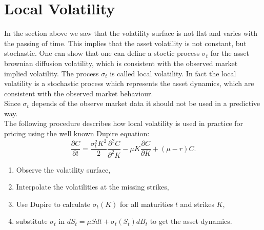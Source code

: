 \documentclass[12pt]{article}
\newcommand{\p}{\partial}
\begin{document}
\section{Local Volatility}
In the section above we saw that the volatility surface is not flat and varies with the passing of time. This implies that the asset volatility is not constant, but stochastic. One can show that one can define a stoctic process $\sigma_t$ for the asset brownian diffusion volatility, which is consistent with the observed market implied volatility. The process $\sigma_t$ is called local volatility. In fact the local volatility is a stochastic process which represents the asset dynamics, which are consistent with the observed market behaviour.\\
Since $\sigma_t$ depends of the observe market data it should not be used in a predictive way.\\
The following procedure describes how local volatility is used in practice for pricing using the well known Dupire equation:
$$\frac{\p C}{\p t}=\frac{\sigma_t^2 K^2}{2}\frac{\p^2 C}{\p^2 K}-\mu K \frac{\p C}{\p K}+(\mu-r)C.$$
\begin{enumerate}
\item Observe the volatility surface,
\item Interpolate the volatilities at the missing strikes,
\item Use Dupire to calculate $\sigma_t(K)$ for all maturities $t$ and strikes $K$,
\item substitute $\sigma_t$ in $dS_t=\mu Sdt + \sigma_t(S_t)dB_t$ to get the asset dynamics.
\end{enumerate}
\end{document}
